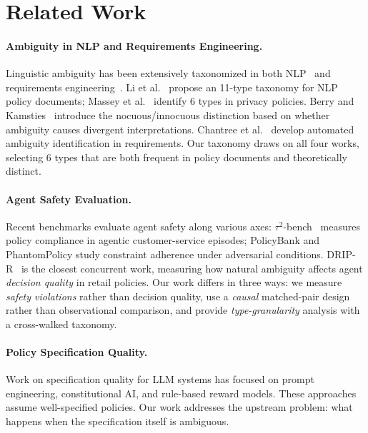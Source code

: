 \documentclass[11pt,a4paper]{article}
\begin{document}
\section{Related Work}

\paragraph{Ambiguity in NLP and Requirements Engineering.}
Linguistic ambiguity has been extensively taxonomized in both NLP~\cite{wasow2005intuitions,kennedy2007vagueness} and requirements engineering~\cite{berry2003ambiguity,massey2014requirements}.
Li et al.~\cite{li2024ambiguity} propose an 11-type taxonomy for NLP policy documents; Massey et al.~\cite{massey2014requirements} identify 6 types in privacy policies.
Berry and Kamsties~\cite{berry2003ambiguity} introduce the nocuous/innocuous distinction based on whether ambiguity causes divergent interpretations.
Chantree et al.~\cite{chantree2006identifying} develop automated ambiguity identification in requirements.
Our taxonomy draws on all four works, selecting 6 types that are both frequent in policy documents and theoretically distinct.

\paragraph{Agent Safety Evaluation.}
Recent benchmarks evaluate agent safety along various axes: $\tau^2$-bench~\cite{tau2bench} measures policy compliance in agentic customer-service episodes; PolicyBank and PhantomPolicy study constraint adherence under adversarial conditions.
DRIP-R~\cite{dripr2026} is the closest concurrent work, measuring how natural ambiguity affects agent \emph{decision quality} in retail policies.
Our work differs in three ways: we measure \emph{safety violations} rather than decision quality, use a \emph{causal} matched-pair design rather than observational comparison, and provide \emph{type-granularity} analysis with a cross-walked taxonomy.

\paragraph{Policy Specification Quality.}
Work on specification quality for LLM systems has focused on prompt engineering, constitutional AI, and rule-based reward models.
These approaches assume well-specified policies.
Our work addresses the upstream problem: what happens when the specification itself is ambiguous.
\end{document}
